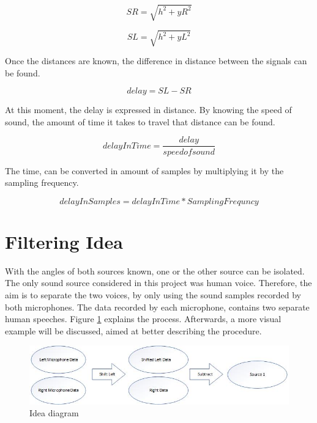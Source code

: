 \begin{equation}
	SR = \sqrt{h^2 + yR^2}
\end{equation}

\begin{equation}
	SL = \sqrt{h^2 + yL^2}
\end{equation}

Once the distances are known, the difference in distance between the signals can be found.

\begin{equation}
	delay = SL - SR
\end{equation}

At this moment, the delay is expressed in distance. By knowing the speed of sound, the amount of
time it takes to travel that distance can be found.

\begin{equation}
	delayInTime = \frac{delay}{speed of sound}
\end{equation}

The time, can be converted in amount of samples by multiplying it by the sampling frequency.

\begin{equation}
	delayInSamples = delayInTime * SamplingFrequncy
\end{equation}

\newpage
\section{Filtering Idea}
With the angles of both sources known, one or the other source can be isolated. The only 
sound source considered in this project was human voice. Therefore, the aim is to 
separate the two voices, by only using the sound samples recorded by both microphones. 
The data recorded by each microphone, contains two separate human speeches.
Figure \ref{fig:IdeaDiagram} explains the process. Afterwards, a more visual example will be discussed,
aimed at better describing the procedure. 

\begin{figure}[htp]
	\centering
	\includegraphics[width=1\textwidth]{Illustrations/IdeaDiagram.jpg}
	\caption{Idea diagram}
	\label{fig:IdeaDiagram}
\end{figure}

